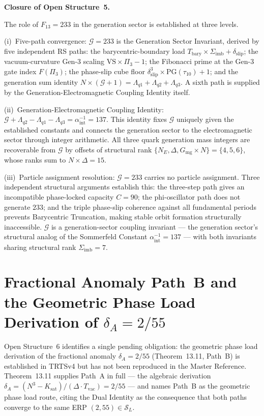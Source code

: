 \documentclass[11pt, letterpaper]{article}
\theoremstyle{definition}
\theoremstyle{plain}
\begin{document}
\begin{rsbox}
\textbf{Closure of Open Structure~5.}

The role of $F_{13} = 233$ in the generation sector is established at three levels.

(i)~Five-path convergence: $\mathcal{G} = 233$ is the Generation Sector
Invariant, derived by five independent RS paths: the barycentric-boundary load
$T_\mathrm{bary} \times \Sigma_\mathrm{imb} + \delta_\mathrm{slip}$; the
vacuum-curvature Gen-3 scaling $\mathrm{VS} \times \Pi_3 - 1$; the Fibonacci prime
at the Gen-3 gate index $F(\Pi_3)$; the phase-slip cube floor
$\delta_\mathrm{slip}^3 \times \mathrm{PG}(\tau_{10}) + 1$; and the generation sum
identity $N \times (\mathcal{G} + 1) = \Lambda_{q1} + \Lambda_{q2} + \Lambda_{q3}$.
A sixth path is supplied by the Generation-Electromagnetic Coupling Identity itself.

(ii)~Generation-Electromagnetic Coupling Identity: $\mathcal{G} + \Lambda_{q2}
- \Lambda_{q1} - \Lambda_{q3} = \alpha^{-1}_\mathrm{int} = 137$. This identity fixes
$\mathcal{G}$ uniquely given the established constants and connects the generation
sector to the electromagnetic sector through integer arithmetic. All three quark
generation mass integers are recoverable from $\mathcal{G}$ by offsets of structural
rank $\{N_E, \Delta, G_\mathrm{mg} \times N\} = \{4, 5, 6\}$, whose ranks sum to
$N \times \Delta = 15$.

(iii)~Particle assignment resolution: $\mathcal{G} = 233$ carries no
particle assignment. Three independent structural arguments establish this: the
three-step path gives an incompatible phase-locked capacity $C = 90$; the
phi-oscillator path does not generate $233$; and the triple phase-slip coherence
against all fundamental periods prevents Barycentric Truncation, making stable orbit
formation structurally inaccessible. $\mathcal{G}$ is a generation-sector coupling
invariant — the generation sector's structural analog of the Sommerfeld Constant
$\alpha^{-1}_\mathrm{int} = 137$ — with both invariants sharing structural
rank $\Sigma_\mathrm{imb} = 7$.

\end{rsbox}


\section{Fractional Anomaly Path~B and the
Geometric Phase Load Derivation of $\delta_A = 2/55$}

Open Structure~6 identifies a single pending obligation: the geometric phase load
derivation of the fractional anomaly $\delta_A = 2/55$ (Theorem~13.11, Path~B)
is established in TRTSv4 but has not been reproduced in the Master Reference.
Theorem~13.11 supplies Path~A in full — the algebraic derivation
$\delta_A = (N^3 - K_\mathrm{sat})/(\Delta \cdot T_\mathrm{vac}) = 2/55$ — and
names Path~B as the geometric phase load route, citing the Dual Identity as the
consequence that both paths converge to the same ERP $(2, 55) \in \mathcal{S}_L$.
\end{document}
